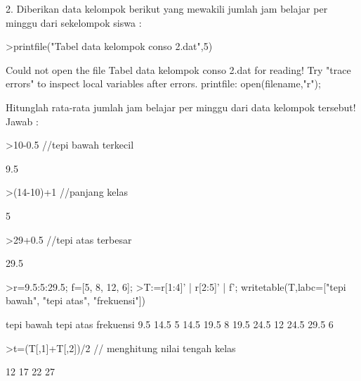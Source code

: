 \documentclass[a4paper,10pt]{article}
\begin{document}
\begin{eulernotebook}
\begin{eulercomment}
\begin{eulercomment}
\begin{eulercomment}
\begin{eulercomment}
\begin{eulercomment}
\begin{eulercomment}
\begin{eulercomment}
\begin{eulercomment}
\begin{eulercomment}
\begin{eulercomment}
\begin{eulercomment}
2. Diberikan data kelompok berikut yang mewakili jumlah jam belajar
per minggu dari sekelompok siswa :
\end{eulercomment}
\begin{eulerprompt}
>printfile("Tabel data kelompok conso 2.dat",5)
\end{eulerprompt}
\begin{euleroutput}
  Could not open the file
  Tabel data kelompok conso 2.dat
  for reading!
  Try "trace errors" to inspect local variables after errors.
  printfile:
      open(filename,"r");
\end{euleroutput}
\begin{eulercomment}
Hitunglah rata-rata jumlah jam belajar per minggu dari data kelompok
tersebut!\\
Jawab :
\end{eulercomment}
\begin{eulerprompt}
>10-0.5  //tepi bawah terkecil
\end{eulerprompt}
\begin{euleroutput}
  9.5
\end{euleroutput}
\begin{eulerprompt}
>(14-10)+1  //panjang kelas
\end{eulerprompt}
\begin{euleroutput}
  5
\end{euleroutput}
\begin{eulerprompt}
>29+0.5  //tepi atas terbesar
\end{eulerprompt}
\begin{euleroutput}
  29.5
\end{euleroutput}
\begin{eulerprompt}
>r=9.5:5:29.5; f=[5, 8, 12, 6];
>T:=r[1:4]' | r[2:5]' | f'; writetable(T,labc=["tepi bawah", "tepi atas", "frekuensi"])
\end{eulerprompt}
\begin{euleroutput}
   tepi bawah tepi atas frekuensi
          9.5      14.5         5
         14.5      19.5         8
         19.5      24.5        12
         24.5      29.5         6
\end{euleroutput}
\begin{eulerprompt}
>t=(T[,1]+T[,2])/2  // menghitung nilai tengah kelas
\end{eulerprompt}
\begin{euleroutput}
             12 
             17 
             22 
             27 
\end{euleroutput}
\begin{eulerprompt}

\end{eulerprompt}
\end{eulercomment}
\end{eulercomment}
\end{eulercomment}
\end{eulercomment}
\end{eulercomment}
\end{eulercomment}
\end{eulercomment}
\end{eulercomment}
\end{eulercomment}
\end{eulercomment}
\end{eulernotebook}
\end{document}
